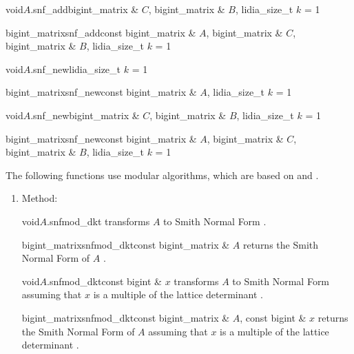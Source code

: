 {\begin{fcode}{void}{$A$.snf_add}{bigint_matrix & $C$, bigint_matrix & $B$, lidia_size_t $k$ = 1}
\end{fcode}

\begin{fcode}{bigint_matrix}{snf_add}{const bigint_matrix & $A$, bigint_matrix & $C$,
    bigint_matrix & $B$, lidia_size_t $k$ = 1}%
\end{fcode}

\begin{fcode}{void}{$A$.snf_new}{lidia_size_t $k$ = 1}
\end{fcode}

\begin{fcode}{bigint_matrix}{snf_new}{const bigint_matrix & $A$, lidia_size_t $k$ = 1}
\end{fcode}

\begin{fcode}{void}{$A$.snf_new}{bigint_matrix & $C$, bigint_matrix & $B$, lidia_size_t $k$ = 1}
\end{fcode}

\begin{fcode}{bigint_matrix}{snf_new}{const bigint_matrix & $A$, bigint_matrix & $C$,
    bigint_matrix & $B$, lidia_size_t $k$ = 1}%
\end{fcode}

The following functions use modular algorithms, which are based on \cite{Cohen:1995} and
\cite{Domich:1989}.

\begin{enumerate}
\item Method:

  \begin{fcode}{void}{$A$.snfmod_dkt}{}
    transforms $A$ to Smith Normal Form \cite{Domich:1989}.
  \end{fcode}

  \begin{fcode}{bigint_matrix}{snfmod_dkt}{const bigint_matrix & $A$}
    returns the Smith Normal Form of $A$ \cite{Domich:1989}.
  \end{fcode}

  \begin{fcode}{void}{$A$.snfmod_dkt}{const bigint & $x$}
    transforms $A$ to Smith Normal Form assuming that $x$ is a multiple of the lattice
    determinant \cite{Domich:1989}.
  \end{fcode}

  \begin{fcode}{bigint_matrix}{snfmod_dkt}{const bigint_matrix & $A$, const bigint & $x$}
    returns the Smith Normal Form of $A$ assuming that $x$ is a multiple of the lattice
    determinant \cite{Domich:1989}.
  \end{fcode}


\end{enumerate}}
